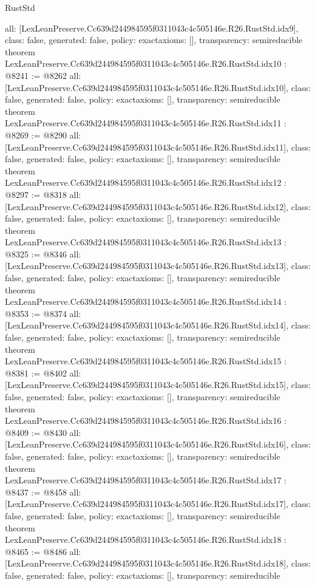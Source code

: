 \begin{lexlean}{RustStd}
\begin{coremodule}
{  all: [LexLeanPreserve.Cc639d244984595f0311043c4c505146e.R26.RustStd.idx9],
  class: false,
  generated: false,
  policy: exact{axioms: []},
  transparency: semireducible
}
theorem LexLeanPreserve.Cc639d244984595f0311043c4c505146e.R26.RustStd.idx10 : @8241 := @8262 {
  all: [LexLeanPreserve.Cc639d244984595f0311043c4c505146e.R26.RustStd.idx10],
  class: false,
  generated: false,
  policy: exact{axioms: []},
  transparency: semireducible
}
theorem LexLeanPreserve.Cc639d244984595f0311043c4c505146e.R26.RustStd.idx11 : @8269 := @8290 {
  all: [LexLeanPreserve.Cc639d244984595f0311043c4c505146e.R26.RustStd.idx11],
  class: false,
  generated: false,
  policy: exact{axioms: []},
  transparency: semireducible
}
theorem LexLeanPreserve.Cc639d244984595f0311043c4c505146e.R26.RustStd.idx12 : @8297 := @8318 {
  all: [LexLeanPreserve.Cc639d244984595f0311043c4c505146e.R26.RustStd.idx12],
  class: false,
  generated: false,
  policy: exact{axioms: []},
  transparency: semireducible
}
theorem LexLeanPreserve.Cc639d244984595f0311043c4c505146e.R26.RustStd.idx13 : @8325 := @8346 {
  all: [LexLeanPreserve.Cc639d244984595f0311043c4c505146e.R26.RustStd.idx13],
  class: false,
  generated: false,
  policy: exact{axioms: []},
  transparency: semireducible
}
theorem LexLeanPreserve.Cc639d244984595f0311043c4c505146e.R26.RustStd.idx14 : @8353 := @8374 {
  all: [LexLeanPreserve.Cc639d244984595f0311043c4c505146e.R26.RustStd.idx14],
  class: false,
  generated: false,
  policy: exact{axioms: []},
  transparency: semireducible
}
theorem LexLeanPreserve.Cc639d244984595f0311043c4c505146e.R26.RustStd.idx15 : @8381 := @8402 {
  all: [LexLeanPreserve.Cc639d244984595f0311043c4c505146e.R26.RustStd.idx15],
  class: false,
  generated: false,
  policy: exact{axioms: []},
  transparency: semireducible
}
theorem LexLeanPreserve.Cc639d244984595f0311043c4c505146e.R26.RustStd.idx16 : @8409 := @8430 {
  all: [LexLeanPreserve.Cc639d244984595f0311043c4c505146e.R26.RustStd.idx16],
  class: false,
  generated: false,
  policy: exact{axioms: []},
  transparency: semireducible
}
theorem LexLeanPreserve.Cc639d244984595f0311043c4c505146e.R26.RustStd.idx17 : @8437 := @8458 {
  all: [LexLeanPreserve.Cc639d244984595f0311043c4c505146e.R26.RustStd.idx17],
  class: false,
  generated: false,
  policy: exact{axioms: []},
  transparency: semireducible
}
theorem LexLeanPreserve.Cc639d244984595f0311043c4c505146e.R26.RustStd.idx18 : @8465 := @8486 {
  all: [LexLeanPreserve.Cc639d244984595f0311043c4c505146e.R26.RustStd.idx18],
  class: false,
  generated: false,
  policy: exact{axioms: []},
  transparency: semireducible
}
\end{coremodule}
\end{lexlean}
